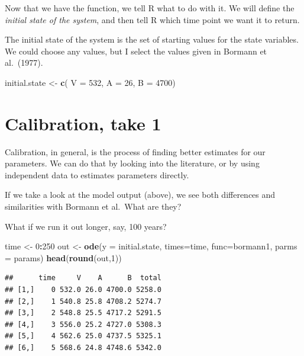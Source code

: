 \documentclass[
]{book}
\newenvironment{Shaded}{\begin{snugshade}}{\end{snugshade}}
\newcommand{\DataTypeTok}[1]{\textcolor[rgb]{0.13,0.29,0.53}{#1}}
\newcommand{\DecValTok}[1]{\textcolor[rgb]{0.00,0.00,0.81}{#1}}
\newcommand{\KeywordTok}[1]{\textcolor[rgb]{0.13,0.29,0.53}{\textbf{#1}}}
\newcommand{\NormalTok}[1]{#1}
\newcommand{\OperatorTok}[1]{\textcolor[rgb]{0.81,0.36,0.00}{\textbf{#1}}}
\newcommand{\StringTok}[1]{\textcolor[rgb]{0.31,0.60,0.02}{#1}}
\begin{document}
Now that we have the function, we tell R what to do with it. We will define the \emph{initial state of the system}, and then tell R which time point we want it to return.

The initial state of the system is the set of starting values for the state variables. We could choose any values, but I select the values given in Bormann et al.~(1977).

\begin{Shaded}
\begin{Highlighting}[]
\NormalTok{initial.state <-}\StringTok{ }\KeywordTok{c}\NormalTok{( }\DataTypeTok{V =} \DecValTok{532}\NormalTok{, }\DataTypeTok{A =} \DecValTok{26}\NormalTok{, }\DataTypeTok{B =} \DecValTok{4700}\NormalTok{)}
\end{Highlighting}
\end{Shaded}

\hypertarget{calibration-take-1}{%
\section{Calibration, take 1}\label{calibration-take-1}}

Calibration, in general, is the process of finding better estimates
for our parameters. We can do that by looking into the literature, or
by using independent data to estimates parameters directly.

If we take a look at the model output (above), we see both differences
and similarities with Bormann et al.~What are they?

What if we run it out longer, say, 100 years?

\begin{Shaded}
\begin{Highlighting}[]
\NormalTok{time <-}\StringTok{ }\DecValTok{0}\OperatorTok{:}\DecValTok{250}
\NormalTok{out <-}\StringTok{ }\KeywordTok{ode}\NormalTok{(}\DataTypeTok{y =}\NormalTok{ initial.state, }\DataTypeTok{times=}\NormalTok{time, }\DataTypeTok{func=}\NormalTok{bormann1, }\DataTypeTok{parms =}\NormalTok{ params)}
\KeywordTok{head}\NormalTok{(}\KeywordTok{round}\NormalTok{(out,}\DecValTok{1}\NormalTok{))}
\end{Highlighting}
\end{Shaded}

\begin{verbatim}
##      time     V    A      B  total
## [1,]    0 532.0 26.0 4700.0 5258.0
## [2,]    1 540.8 25.8 4708.2 5274.7
## [3,]    2 548.8 25.5 4717.2 5291.5
## [4,]    3 556.0 25.2 4727.0 5308.3
## [5,]    4 562.6 25.0 4737.5 5325.1
## [6,]    5 568.6 24.8 4748.6 5342.0
\end{verbatim}
\end{document}
